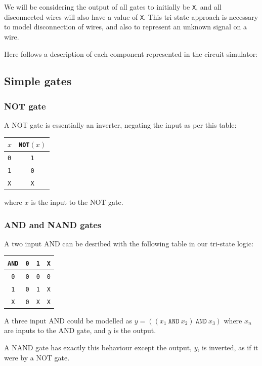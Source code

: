 \documentclass[12pt, a4paper, oneside,titlepage]{article}
\begin{document}
We will be considering the output of all gates to initially be \texttt{X}, and all disconnected wires will also have a value of \texttt{X}. This tri-state approach is necessary to model disconnection of wires, and also to represent an unknown signal on a wire. 

Here follows a description of each component represented in the circuit simulator:

\subsection{Simple gates}
\subsubsection{NOT gate}
A NOT gate is essentially an inverter, negating the input as per this table:
\begin{center}
\begin{tabular}{l |c}
$x$ & \texttt{NOT}$(x)$\\
\hline
\texttt{0} & \texttt{1}\\
\hline
\texttt{1} & \texttt{0}\\
\hline
\texttt{X} & \texttt{X}\\
\hline
\end{tabular}
\end{center}
where $x$ is the input to the NOT gate. 

\subsubsection{AND and NAND gates}
A two input AND can be desribed with the following table in our tri-state logic:
\begin{center}
\begin{tabular}{c |l  l l}
\texttt{AND} & \texttt{0} & \texttt{1} & \texttt{X}\\
\hline
\texttt{0} & \texttt{0} & \texttt{0} & \texttt{0}\\
\hline
\texttt{1} & \texttt{0} & \texttt{1} & \texttt{X}\\
\hline
\texttt{X} & \texttt{0} & \texttt{X} & \texttt{X}\\
\hline
\end{tabular}
\end{center}
A three input AND could be modelled as $y = ((x_1\ \texttt{AND}\ x_2)\ \texttt{AND}\ x_3)$ where $x_n$ are inputs to the AND gate, and $y$ is the output. 

A NAND gate has exactly this behaviour except the output, $y$, is inverted, as if it were by a NOT gate. 
\end{document}
